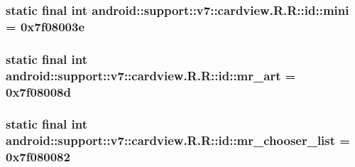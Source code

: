 \hypertarget{classandroid_1_1support_1_1v7_1_1cardview_1_1_r_1_1id_6cf63a722aef5324cf26330a250c9895}{
\subsubsection[{mini}]{\setlength{\rightskip}{0pt plus 5cm}static final int android::support::v7::cardview.R.R::id::mini = 0x7f08003e}}
\label{classandroid_1_1support_1_1v7_1_1cardview_1_1_r_1_1id_6cf63a722aef5324cf26330a250c9895}


\hypertarget{classandroid_1_1support_1_1v7_1_1cardview_1_1_r_1_1id_199201cb48f582a503487863d17e8cf2}{
\subsubsection[{mr\_\-art}]{\setlength{\rightskip}{0pt plus 5cm}static final int android::support::v7::cardview.R.R::id::mr\_\-art = 0x7f08008d}}
\label{classandroid_1_1support_1_1v7_1_1cardview_1_1_r_1_1id_199201cb48f582a503487863d17e8cf2}


\hypertarget{classandroid_1_1support_1_1v7_1_1cardview_1_1_r_1_1id_3ebc343b0f5f4edce0d93a1c630db3d7}{
\subsubsection[{mr\_\-chooser\_\-list}]{\setlength{\rightskip}{0pt plus 5cm}static final int android::support::v7::cardview.R.R::id::mr\_\-chooser\_\-list = 0x7f080082}}
\label{classandroid_1_1support_1_1v7_1_1cardview_1_1_r_1_1id_3ebc343b0f5f4edce0d93a1c630db3d7}


